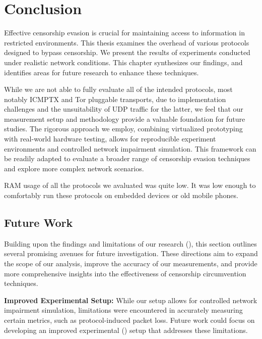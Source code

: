 
\chapter{Conclusion}
\label{chap:conclusion}

Effective censorship evasion is crucial for maintaining access to information in restricted environments.
This thesis examines the overhead of various protocols designed to bypass censorship.
We present the results of experiments conducted under realistic network conditions.
This chapter synthesizes our findings, and identifies areas for future research to enhance these techniques.

While we are not able to fully evaluate all of the intended protocols, most notably ICMPTX and Tor pluggable transports, due to implementation challenges and the unsuitability of UDP traffic for the latter, we feel that our measurement setup and methodology provide a valuable foundation for future studies.
The rigorous approach we employ, combining virtualized prototyping with real-world hardware testing, allows for reproducible experiment environments and controlled network impairment simulation.
This framework can be readily adapted to evaluate a broader range of censorship evasion techniques and explore more complex network scenarios.


RAM usage of all the protocols we avaluated was quite low.
It was low enough to comfortably run these protocols on embedded devices or old mobile phones.


\section{Future Work}
Building upon the findings and limitations of our research (), this section outlines several promising avenues for future investigation.
These directions aim to expand the scope of our analysis, improve the accuracy of our measurements, and provide more comprehensive insights into the effectiveness of censorship circumvention techniques.

\noindent\textbf{Improved Experimental Setup:}
While our setup allows for controlled network impairment simulation, limitations were encountered in accurately measuring certain metrics, such as protocol-induced packet loss.
Future work could focus on developing an improved experimental () setup that addresses these limitations.

